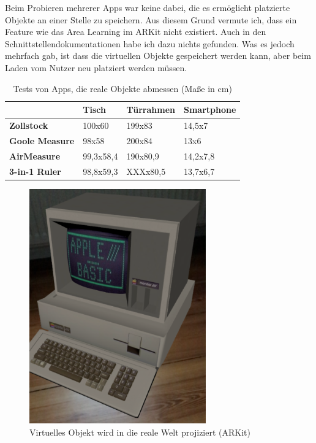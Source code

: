 Beim Probieren mehrerer Apps war keine dabei, die es ermöglicht platzierte Objekte an einer Stelle zu speichern. Aus diesem Grund vermute ich, dass ein Feature wie das Area Learning im ARKit nicht existiert. Auch in den Schnittstellendokumentationen habe ich dazu nichts gefunden. Was es jedoch mehrfach gab, ist dass die virtuellen Objekte gespeichert werden kann, aber beim Laden vom Nutzer neu platziert werden müssen.

\begin{table}[h]
	\centering
	\begin{tabular}{|p{1.9cm}|p{1.74cm}|p{1.74cm}|p{1.74cm}|}
		\hline
		& \textbf{Tisch} & \textbf{Türrahmen} & \textbf{Smartphone}\\
		\hline
		\textbf{Zollstock} & 100x60 & 199x83 & 14,5x7\\
		\hline
		\textbf{Goole Measure} & 98x58 & 200x84 & 13x6\\
		\hline
		\textbf{AirMeasure}& 99,3x58,4 & 190x80,9 & 14,2x7,8\\
		\hline
		\textbf{3-in-1 Ruler} & 98,8x59,3 & XXXx80,5 & 13,7x6,7\\
		\hline
	\end{tabular}
	\caption{Tests von Apps, die reale Objekte abmessen (Maße in cm)}
	\label{ar_measure_apps_comparison}
\end{table}

\begin{figure}[h]
	\centering
	\includegraphics[width=3in]{pictures/arkit_object}
	\caption{Virtuelles Objekt wird in die reale Welt projiziert (ARKit)}
	\label{example_app_arkit}
\end{figure}

